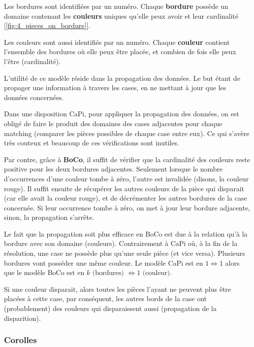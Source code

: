	Les bordures sont identifiées par un numéro. Chaque \textbf{bordure} possède un domaine contenant les \textbf{couleurs} uniques qu'elle peux avoir et leur cardinalité [\autoref{fig:4_pieces_on_bordure}].
	
	Les couleurs sont aussi identifiés par un numéro. Chaque \textbf{couleur} contient l'ensemble des bordures où elle peux être placée, et combien de fois elle peux l'être (cardinalité).
	
	L'utilité de ce modèle réside dans la propagation des données. Le but étant de propager une information à travers les cases, en ne mettant à jour que les données concernées.
	
	Dans une disposition CaPi, pour appliquer la propagation des données, on est obligé de faire le produit des domaines des cases adjacentes pour chaque matching (comparer les pièces possibles de chaque case entre eux). Ce qui s'avère très couteux et beaucoup de ces vérifications sont inutiles.
	
	Par contre, grâce à \textbf{BoCo}, il suffit de vérifier que la cardinalité des couleurs reste positive pour les deux bordures adjacentes. Seulement lorsque le nombre d'occurrences d'une couleur tombe à zéro, l'autre est invalidée (disons, la couleur rouge). Il suffit ensuite de récupérer les autres couleurs de la pièce qui disparait (car elle avait la couleur rouge), et de décrémenter les autres bordures de la case concernée. Si leur occurrence tombe à zéro, on met à jour leur bordure adjacente, sinon, la propagation s'arrête.
	
	\begin{note}
		Le fait que la propagation soit plus efficace en BoCo est due à la relation qu'à la bordure avec son domaine (couleurs). Contrairement à CaPi où, à la fin de la résolution, une case ne possède plus qu'une seule pièce (et vice versa). Plusieurs bordures vont posséder une même couleur. Le modèle CaPi est en $1 \Leftrightarrow 1$ alors que le modèle BoCo est en $k \text{ (bordures) } \Leftrightarrow 1 \text{ (couleur)}$.
	\end{note}

	\begin{exmp}
		Si une couleur disparait, alors toutes les pièces l'ayant ne peuvent plus être placées à cette case, par conséquent, les autres bords de la case ont (probablement) des couleurs qui disparaissent aussi (propagation de la disparition).
	\end{exmp}

	\subsubsection{Corolles}


